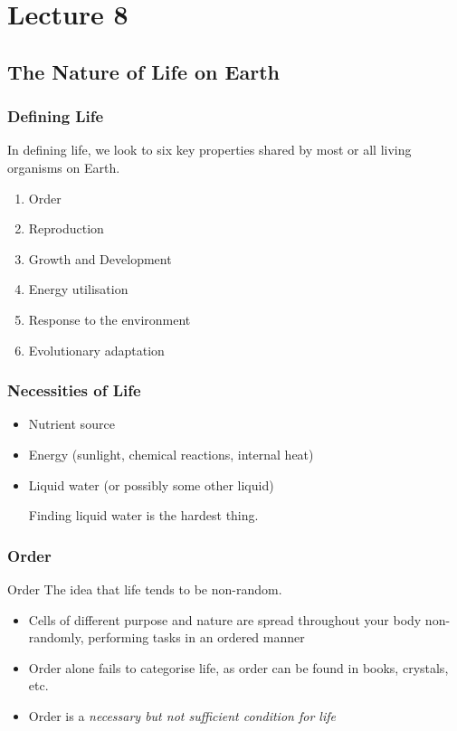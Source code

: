 \documentclass[class=article, crop=false]{standalone}
\begin{document}
  \section{Lecture 8}
  \subsection{The Nature of Life on Earth}
  \subsubsection{Defining Life}
  In defining life, we look to six key properties shared by most or all living organisms on Earth.
  \begin{enumerate}
    \item Order
    \item Reproduction
    \item Growth and Development
    \item Energy utilisation
    \item Response to the environment
    \item Evolutionary adaptation
  \end{enumerate}
  \subsubsection{Necessities of Life}
  \begin{itemize}
    \item Nutrient source
    \item Energy (sunlight, chemical reactions, internal heat)
    \item Liquid water (or possibly some other liquid)
    \begin{note}{}
      Finding liquid water is the hardest thing.
    \end{note}
  \end{itemize}
  \subsubsection{Order}
  \begin{definition}{Order}
    The idea that life tends to be non-random.
  \end{definition}
  \begin{itemize}
    \item Cells of different purpose and nature are spread throughout your body non-randomly, performing tasks in an ordered manner
    \item Order alone fails to categorise life, as order can be found in books, crystals, etc.
    \item Order is a \emph{necessary but not sufficient condition for life}
  \end{itemize}
\end{document}
